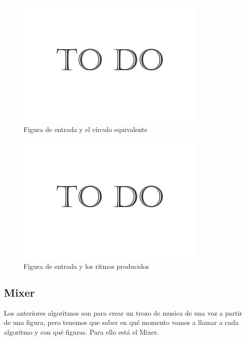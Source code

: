 		\begin{figure}[htbp]
		\centering
		\hspace*{0.0in}
		\includegraphics[scale=0.57]{graphics/todo.png}
		\caption{Figura de entrada y el círculo equivalente}
		\label{fig:Figura2Voz4}
		\end{figure}

		\begin{figure}[htbp]
		\centering
		\hspace*{0.0in}
		\includegraphics[scale=0.57]{graphics/todo.png}
		\caption{Figura de entrada y los ritmos producidos}
		\label{fig:Figura3Voz4}
		\end{figure}


\subsection{Mixer}

Los anteriores algoritmos son para crear un trozo de musica de una voz a partir de una figura, pero tenemos que saber en qué momento vamos a llamar a cada algoritmo y con qué figuras. Para ello está el Mixer.

